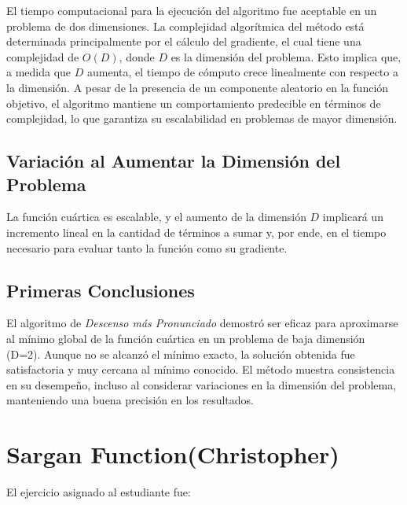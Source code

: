 \documentclass{article}
\begin{document}
	El tiempo computacional para la ejecución del algoritmo fue aceptable en un problema de dos dimensiones. La complejidad algorítmica del método está determinada principalmente por el cálculo del gradiente, el cual tiene una complejidad de $O(D)$, donde $D$ es la dimensión del problema. Esto implica que, a medida que $D$ aumenta, el tiempo de cómputo crece linealmente con respecto a la dimensión. A pesar de la presencia de un componente aleatorio en la función objetivo, el algoritmo mantiene un comportamiento predecible en términos de complejidad, lo que garantiza su escalabilidad en problemas de mayor dimensión.
	
	
	\subsection{Variación al Aumentar la Dimensión del Problema}
	
	La función cuártica es escalable, y el aumento de la dimensión $D$ implicará un incremento lineal en la cantidad de términos a sumar y, por ende, en el tiempo necesario para evaluar tanto la función como su gradiente.
	
	\subsection{Primeras Conclusiones}
	
	El algoritmo de \textit{Descenso más Pronunciado} demostró ser eficaz para aproximarse al mínimo global de la función cuártica en un problema de baja dimensión (D=2). Aunque no se alcanzó el mínimo exacto, la solución obtenida fue satisfactoria y muy cercana al mínimo conocido. El método muestra consistencia en su desempeño, incluso al considerar variaciones en la dimensión del problema, manteniendo una buena precisión en los resultados.

		
	
	\section{Sargan Function(Christopher)}
	
	El ejercicio asignado al estudiante fue:
	
	\vspace*{1cm}
	
	
\end{document}
